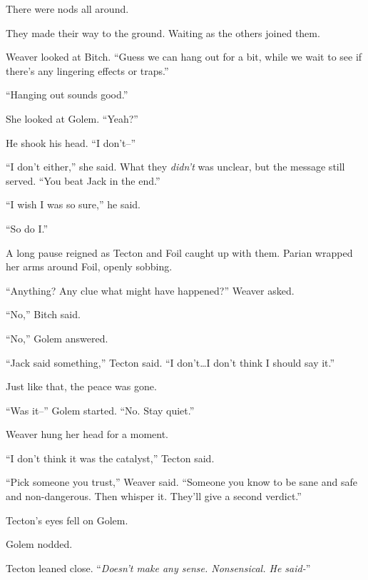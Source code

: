 There were nods all around.



They made their way to the ground.  Waiting as the others joined them.



Weaver looked at Bitch.  ``Guess we can hang out for a bit, while we wait to see if there's any lingering effects or traps.''



``Hanging out sounds good.''



She looked at Golem.  ``Yeah?''



He shook his head.  ``I don't--''



``I don't either,'' she said.  What they \emph{didn't }was unclear, but the message still served.  ``You beat Jack in the end.''



``I wish I was so sure,'' he said.



``So do I.''



A long pause reigned as Tecton and Foil caught up with them.  Parian wrapped her arms around Foil, openly sobbing.



``Anything?  Any clue what might have happened?''  Weaver asked.



``No,'' Bitch said.



``No,'' Golem answered.



``Jack said something,'' Tecton said.  ``I don't\ldots I don't think I should say it.''



Just like that, the peace was gone.



``Was it--'' Golem started.  ``No.  Stay quiet.''



Weaver hung her head for a moment.



``I don't think it was the catalyst,'' Tecton said.



``Pick someone you trust,'' Weaver said.  ``Someone you know to be sane and safe and non-dangerous.  Then whisper it.  They'll give a second verdict.''



Tecton's eyes fell on Golem.



Golem nodded.



Tecton leaned close.  ``\emph{Doesn't make any sense.  Nonsensical.  He said-}''





